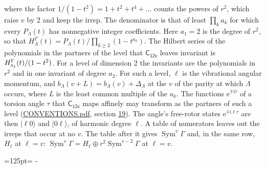 \documentclass[10pt,a4paper]{article}
\newcommand{\needspace}[1]{\par\penalty-100\begingroup\dimen0=#1\relax\dimen2=\pagegoal
  \advance\dimen2-\pagetotal\ifdim\dimen0>\dimen2\relax\ifdim\dimen2>0pt\vfil\break\fi\fi
  \endgroup}
\numberwithin{equation}{section}
\newcommand{\grp}[1]{\mathsf{#1}}
\newcommand{\irr}[1]{\text{\normalfont\scshape #1}}
\newcommand{\iunit}{\mathrm{i}}
\newcommand{\expe}{\mathrm{e}}
\newcommand{\occ}[1]{\lvert #1\rangle}
\begin{document}
where the factor $1/(1 - t^2) = 1 + t^2 + t^4 + \dots$ counts the powers of $r^2$, which raise $v$ by 2 and keep the irrep. The denominator is that of least $\prod_k a_k$ for which every $P_\Lambda(t)$ has nonnegative integer coefficients. Here $a_1 = 2$ is the degree of $r^2$, so that $H^{\Gamma}_\Lambda(t) = P_\Lambda(t)/\prod_{k\ge2}(1 - t^{a_k})$. The Hilbert series of the polynomials in the partners of the level that $\grp{C_{12v}}$ leaves invariant is $H^{\Gamma}_{\irr{a}_{1}}(t)/(1 - t^2)$. For a level of dimension 2 the invariants are the polynomials in $r^2$ and in one invariant of degree $a_2$. \label{n:index.overtone.period}\label{n:index.increment.unitary}For such a level, $\ell$ is the vibrational angular momentum, and $b_\Lambda(v + L) = b_\Lambda(v) + \Delta_\Lambda$ at the $v$ of the parity at which $\Lambda$ occurs, where $L$ is the least common multiple of the $a_k$. \label{n:local.torsion.angle}The functions $\expe^{\mp\iunit\tau}$ of a torsion angle $\tau$ that $\grp{C_{12v}}$ maps affinely may transform as the partners of such a level (\href{../../CONVENTIONS.pdf}{CONVENTIONS.pdf}, section \href{../../CONVENTIONS.pdf\#conv.19}{19}). The angle's free-rotor states $\expe^{\mp\iunit\ell\tau}$ are then $\occ{\ell 0}$ and $\occ{0 \ell}$, of harmonic degree $\ell$. A table of numerators leaves out the irreps that occur at no $v$. The table after it gives $\operatorname{Sym}^{v}\Gamma$ and, in the same row, $H_\ell$ at $\ell = v$: $\operatorname{Sym}^{v}\Gamma = H_\ell \oplus r^2\operatorname{Sym}^{v-2}\Gamma$ at $\ell = v$.
\needspace{125pt}
\end{document}
